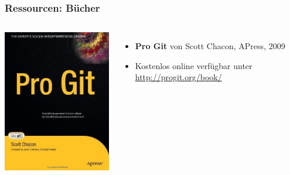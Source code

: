 \documentclass{beamer}
\begin{document}
\begin{frame}
 \frametitle{Ressourcen: Bücher}
  


\begin{columns}
\column{ 2.5cm }
\includegraphics[width=\textwidth]{bilder/progit.png}
\column{ 7cm }
\begin{itemize}
  \item \textbf{Pro Git} von Scott Chacon, APress, 2009
  \item Kostenlos online verfügbar unter \url{http://progit.org/book/}
\end{itemize}
\end{columns}


\vspace{.5cm}



\end{frame}
\end{document}
